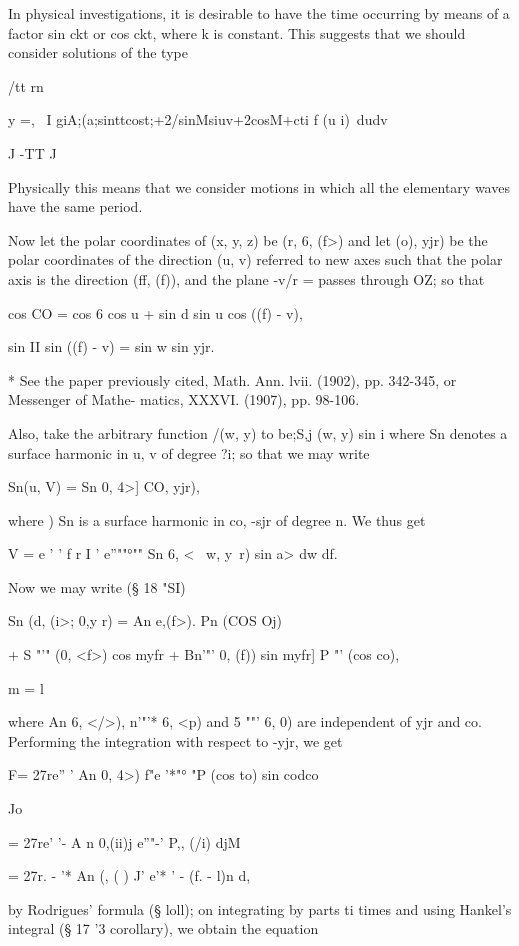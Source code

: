 In physical investigations, it is desirable to have the time occurring
by means of a factor sin ckt or cos ckt, where k is constant. This
suggests that we should consider solutions of the type

/tt rn

y =, \ I giA;(a;sinttcost;+2/sinMsiuv+2cosM+cti f (u i)\ dudv

J -TT J

Physically this means that we consider motions in which all the
elementary waves have the same period.

Now let the polar coordinates of (x, y, z) be (r, 6, (f>) and let (o),
yjr) be the polar coordinates of the direction (u, v) referred to new
axes such that the polar axis is the direction (ff, (f)), and the
plane -v/r = passes through OZ; so that

cos CO = cos 6 cos u + sin d sin u cos ((f) - v),

sin II sin ((f) - v) = sin w sin yjr.

* See the paper previously cited, Math. Ann. lvii. (1902), pp.
342-345, or Messenger of Mathe- matics, XXXVI. (1907), pp. 98-106.

%
%

Also, take the arbitrary function /(w, y) to be;S,j (w, y) sin i
where Sn denotes a surface harmonic in u, v of degree ?i; so that we
may write

Sn(u, V) = Sn 0, 4>] CO, yjr),

where ) Sn is a surface harmonic in co, -sjr of degree n. We
thus get

V = e ' ' f r I ' e''""°"" Sn 6, < \ w, y\ r) sin a> dw df.

Now we may write (§ 18 "SI)

Sn (d, (i>; 0,y r) = An e,(f>). Pn (COS Oj)

+ S "'" (0, <f>) cos myfr + Bn'"' 0, (f)) sin myfr] P "' (cos co),

m = l

where An 6, </>), n'"'* 6, <p) and 5 ""' 6, 0) are independent of yjr
and co. Performing the integration with respect to -yjr, we get

F= 27re'' ' An 0, 4>) f"e '*"° "P (cos to) sin codco

Jo

= 27re' '- A n 0,(ii)j e''"-' P,, (/i) djM

= 27r. - '* An (, ( ) J' e'* ' - (f. - l)n d,

by Rodrigues' formula (§ loll); on integrating by parts ti times and
using Hankel's integral (§ 17 '3 corollary), we obtain the equation


